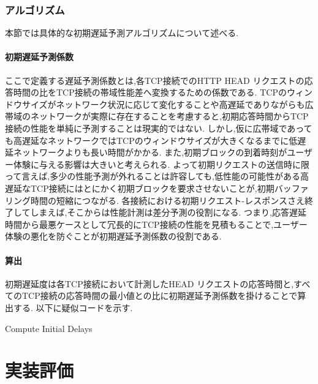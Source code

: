 \documentclass[a4j,12pt]{gradthesis_utf8}
\begin{document}
\subsection{アルゴリズム}
\label{yosokuhouhou}
本節では具体的な初期遅延予測アルゴリズムについて述べる.

\subsubsection{初期遅延予測係数}
ここで定義する遅延予測係数とは,各TCP接続でのHTTP HEAD リクエストの応答時間の比をTCP接続の帯域性能差へ変換するための係数である.
TCPのウィンドウサイズがネットワーク状況に応じて変化することや高遅延でありながらも広帯域のネットワークが実際に存在することを考慮すると,初期応答時間からTCP接続の性能を単純に予測することは現実的ではない.
しかし,仮に広帯域であっても高遅延なネットワークではTCPのウィンドウサイズが大きくなるまでに低遅延ネットワークよりも長い時間がかかる.
また,初期ブロックの到着時刻がユーザー体験に与える影響は大きいと考えられる.
よって初期リクエストの送信時に限って言えば,多少の性能予測が外れることは許容しても,低性能の可能性がある高遅延なTCP接続にはとにかく初期ブロックを要求させないことが,初期バッファリング時間の短縮につながる.
各接続における初期リクエスト-レスポンスさえ終了してしまえば,そこからは性能計測は差分予測の役割になる.
つまり,応答遅延時間から最悪ケースとして冗長的にTCP接続の性能を見積もることで,ユーザー体験の悪化を防ぐことが初期遅延予測係数の役割である.

\subsubsection{算出}
初期遅延度は各TCP接続において計測したHEAD リクエストの応答時間と,すべてのTCP接続の応答時間の最小値との比に初期遅延予測係数を掛けることで算出する.
以下に疑似コードを示す.

\begin{algorithm}
	\caption{Compute Initial Delays}
	\begin{algorithmic}[1]
		\EndFor
	\end{algorithmic}
	
\end{algorithm}


\chapter{実装評価}\label{sec:sec4}
\end{document}
